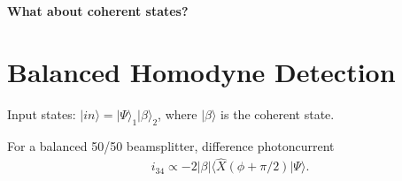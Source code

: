 \documentclass[../../note.tex]{subfiles}
\begin{document}
\textbf{What about coherent states?}

\section{Balanced Homodyne Detection}
Input states: $\vert in \rangle = \vert \Psi \rangle_1 \vert \beta \rangle_2$, where $\vert \beta \rangle$ is the coherent state.

\begin{lemma}
    For a balanced 50/50 beamsplitter, difference photoncurrent
    \begin{align}
        i_{34} \propto -2 \vert \beta \vert \langle \hat{X} \left(\phi + \pi/2 \right) \vert \Psi \rangle.
    \end{align}
\end{lemma}
\end{document}
